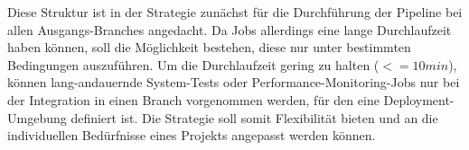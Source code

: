 Diese Struktur ist in der Strategie zunächst für die Durchführung der Pipeline bei allen Ausgangs-Branches angedacht.
Da Jobs allerdings eine lange Durchlaufzeit haben können, soll die Möglichkeit bestehen, diese nur unter
bestimmten Bedingungen auszuführen.
Um die Durchlaufzeit gering zu halten ($<= 10min$), können lang-andauernde System-Tests oder
Performance-Monitoring-Jobs nur bei der Integration in einen Branch vorgenommen werden, für den eine Deployment-Umgebung
definiert ist.
Die Strategie soll somit Flexibilität bieten und an die individuellen Bedürfnisse eines Projekts angepasst werden
können.

\clearpage
